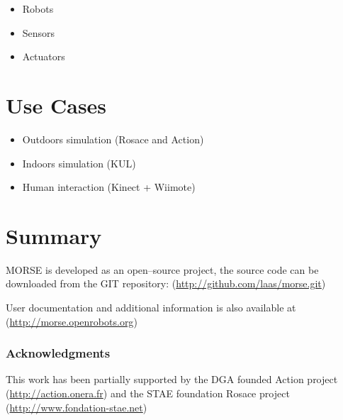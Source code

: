 \documentclass{llncs}
\begin{document}
\begin{itemize}
  \item Robots
  \item Sensors
  \item Actuators
\end{itemize}


\section{Use Cases}

\begin{itemize}
  \item Outdoors simulation (Rosace \cite{springerlink:10.1007/978-3-642-12384-9_18,springerlink:10.1007/978-3-642-28786-2_32} and Action)
  \item Indoors simulation (KUL)
  \item Human interaction (Kinect + Wiimote)
\end{itemize}



\section{Summary}
\label{section:discussion}


MORSE is developed as an open--source project, the source code can be
downloaded from the GIT repository:
(\url{http://github.com/laas/morse.git})

User documentation and additional information is also available at
(\url{http://morse.openrobots.org})


\subsubsection*{Acknowledgments}
This work has been partially supported by the DGA founded Action project
(\url{http://action.onera.fr}) and the STAE foundation Rosace project\\
(\url{http://www.fondation-stae.net})



\end{document}
